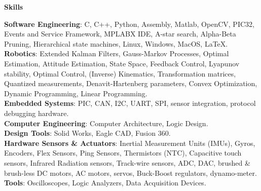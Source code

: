 \documentclass[paper=a4,fontsize=11pt]{article} %
\def \sectionSpace      {0.7cm}     %
\def \subSectionSpace   {0.3cm}     %
\def \leftColSpace      {0.12}      %
\def \bigMiddleColSpace {0.875}     %
\def \lineWidth         {18cm}      %
\def \lineThickness     {2pt}       %
\begin{document}
\vspace{\sectionSpace}
\noindent
\begin{minipage}[t]{\leftColSpace\linewidth}
\noindent \textbf{Skills}\\
\end{minipage}
\begin{minipage}[t]{\bigMiddleColSpace\linewidth}
    \begin{flushleft}
        \noindent \textbf{Software Engineering}: C, C++, Python, Assembly, Matlab, OpenCV, PIC32, Events and Service Framework, MPLABX IDE, A-star search, Alpha-Beta Pruning, Hierarchical state machines, Linux, Windows, MacOS, \LaTeX.\\
        \vspace{\subSectionSpace}
        \noindent \textbf{Robotics}: Extended Kalman Filters, Gauss-Markov Processes, Optimal Estimation, Attitude Estimation, State Space, Feedback Control, Lyapunov stability, Optimal Control, (Inverse) Kinematics, Transformation matrices, Quantized measurements, Denavit-Hartenberg parameters, Convex Optimization, Dynamic Programming, Linear Programming.\\
        \vspace{\subSectionSpace}
        \noindent \textbf{Embedded Systems}: PIC, CAN, I2C, UART, SPI, sensor integration, protocol debugging hardware.\\
        \vspace{\subSectionSpace}
        \noindent \textbf{Computer Engineering}: Computer Architecture, Logic Design.\\
        \vspace{\subSectionSpace}
        \noindent \textbf{Design Tools}: Solid Works, Eagle CAD, Fusion 360.\\
        \vspace{\subSectionSpace}
        \noindent \textbf{Hardware Sensors \& Actuators}: Inertial Measurement Units (IMUs), Gyros, Encoders, Flex Sensors, Ping Sensors, Thermistors (NTC), Capacitive touch sensors, Infrared Radiation sensors, Track-wire sensors, ADC, DAC, brushed \& brush-less DC motors, AC motors, servos, Buck-Boost regulators, dynamo-meter.\\
        \vspace{\subSectionSpace}
        \noindent \textbf{Tools}: Oscilloscopes, Logic Analyzers, Data Acquisition Devices.\\
    \end{flushleft}
\end{minipage}
\end{document}
